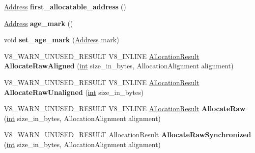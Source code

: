 \begin{DoxyCompactItemize}
\mbox{\label{classv8_1_1internal_1_1NewSpace_a2a64b2eb7052229d512ba572abc9199c}} 
\mbox{\hyperlink{classuintptr__t}{Address}} {\bfseries first\+\_\+allocatable\+\_\+address} ()
\item 
\mbox{\label{classv8_1_1internal_1_1NewSpace_ac2db326d663e8f24e1e699d75a2373ad}} 
\mbox{\hyperlink{classuintptr__t}{Address}} {\bfseries age\+\_\+mark} ()
\item 
\mbox{\label{classv8_1_1internal_1_1NewSpace_a61f2c59fea2f6c0626fbae3d75aa4dd2}} 
void {\bfseries set\+\_\+age\+\_\+mark} (\mbox{\hyperlink{classuintptr__t}{Address}} mark)
\item 
\mbox{\label{classv8_1_1internal_1_1NewSpace_aefbb891761febbf50bcbc1fdbff33a02}} 
V8\+\_\+\+W\+A\+R\+N\+\_\+\+U\+N\+U\+S\+E\+D\+\_\+\+R\+E\+S\+U\+LT V8\+\_\+\+I\+N\+L\+I\+NE \mbox{\hyperlink{classv8_1_1internal_1_1AllocationResult}{Allocation\+Result}} {\bfseries Allocate\+Raw\+Aligned} (\mbox{\hyperlink{classint}{int}} size\+\_\+in\+\_\+bytes, Allocation\+Alignment alignment)
\item 
\mbox{\label{classv8_1_1internal_1_1NewSpace_a0168c4ab5065280993240af08641df0a}} 
V8\+\_\+\+W\+A\+R\+N\+\_\+\+U\+N\+U\+S\+E\+D\+\_\+\+R\+E\+S\+U\+LT V8\+\_\+\+I\+N\+L\+I\+NE \mbox{\hyperlink{classv8_1_1internal_1_1AllocationResult}{Allocation\+Result}} {\bfseries Allocate\+Raw\+Unaligned} (\mbox{\hyperlink{classint}{int}} size\+\_\+in\+\_\+bytes)
\item 
\mbox{\label{classv8_1_1internal_1_1NewSpace_a83585ec1fa05be07ea4e4511425ccbc6}} 
V8\+\_\+\+W\+A\+R\+N\+\_\+\+U\+N\+U\+S\+E\+D\+\_\+\+R\+E\+S\+U\+LT V8\+\_\+\+I\+N\+L\+I\+NE \mbox{\hyperlink{classv8_1_1internal_1_1AllocationResult}{Allocation\+Result}} {\bfseries Allocate\+Raw} (\mbox{\hyperlink{classint}{int}} size\+\_\+in\+\_\+bytes, Allocation\+Alignment alignment)
\item 
\mbox{\label{classv8_1_1internal_1_1NewSpace_af9476d70122c17658ee43a6c782615df}} 
V8\+\_\+\+W\+A\+R\+N\+\_\+\+U\+N\+U\+S\+E\+D\+\_\+\+R\+E\+S\+U\+LT \mbox{\hyperlink{classv8_1_1internal_1_1AllocationResult}{Allocation\+Result}} {\bfseries Allocate\+Raw\+Synchronized} (\mbox{\hyperlink{classint}{int}} size\+\_\+in\+\_\+bytes, Allocation\+Alignment alignment)

\end{DoxyCompactItemize}
